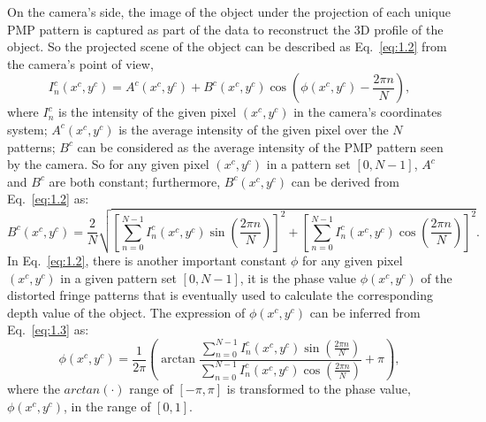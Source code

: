 \documentclass[]{spie}  %
\begin{document}
On the camera's side, the image of  the object under the projection of each unique PMP pattern is captured as part of the data to reconstruct the 3D profile of the object. So the projected scene of the object can be described as Eq.~\eqref{eq:1.2} from the camera's point of view, 
\begin{equation} \label{eq:1.2}
I^c_n(x^c, y^c) =  A^c(x^c, y^c) + B^c(x^c, y^c)\cos\left(\phi(x^c, y^c) - \frac{2\pi n}{N}\right),
\end{equation}
where $I^c_n$ is the intensity of the given pixel $(x^c, y^c)$ in the camera's coordinates system; $A^c(x^c, y^c)$ is the average intensity of the given pixel over the $N$ patterns; $B^c$ can be considered as the average intensity of the PMP pattern seen by the camera. So for any given pixel $(x^c, y^c)$ in a pattern set $[0, N-1]$, $A^c$ and $B^c$ are both constant; furthermore, $B^c(x^c, y^c)$ can be derived from Eq.~\eqref{eq:1.2} as:
\begin{equation} \label{eq:1.3}
B^c(x^c, y^c) = \frac{2}{N}\sqrt{\left[\sum_{n=0}^{N-1}I_n^c(x^c, y^c)\sin (\frac{2\pi n}{N})\right]^2 + \left[\sum_{n=0}^{N-1}I_n^c(x^c, y^c)\cos (\frac{2\pi n}{N})\right]^2}.
\end{equation}
In Eq.~\ref{eq:1.2}, there is another important constant $\phi$ for any given pixel $(x^c, y^c)$ in a given pattern set $[0, N-1]$, it is the phase value $\phi (x^c, y^c)$ of the distorted fringe patterns that is eventually used to calculate the corresponding depth value of the object. The expression of $\phi (x^c, y^c)$ can be inferred from Eq.~\eqref{eq:1.3} as:
  \begin{equation} \label{eq:1.4}
  	\phi (x^c, y^c) = \frac{1}{2\pi}\left(\arctan \frac{\sum_{n=0}^{N-1} I^c_n(x^c, y^c)\sin(\frac{2\pi n}{N})}{\sum_{n=0}^{N-1} I^c_n(x^c, y^c)\cos(\frac{2\pi n}{N})} + \pi\right),
  \end{equation}
where the $arctan(\cdot)$ range of $[-\pi,\pi]$ is transformed to the phase value, $\phi (x^c, y^c)$, in the range of $[0, 1]$.
\end{document}
